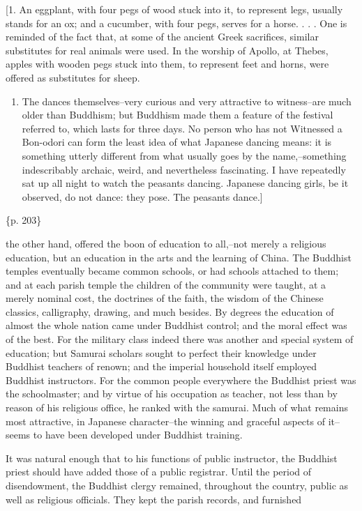 [1. An eggplant, with four pegs of wood stuck into it, to represent legs, usually stands for an ox; and a cucumber, with four pegs, serves for a horse. . . . One is reminded of the fact that, at some of the ancient Greek sacrifices, similar substitutes for real animals were used. In the worship of Apollo, at Thebes, apples with wooden pegs stuck into them, to represent feet and horns, were offered as substitutes for sheep.

\begin{enumerate}
\item The dances themselves--very curious and very attractive to witness--are much older than Buddhism; but Buddhism made them a feature of the festival referred to, which lasts for three days. No person who has not Witnessed a Bon-odori can form the least idea of what Japanese dancing means: it is something utterly different from what usually goes by the name,--something indescribably archaic, weird, and nevertheless fascinating. I have repeatedly sat up all night to watch the peasants dancing. Japanese dancing girls, be it observed, do not dance: they pose. The peasants dance.]
\end{enumerate}

\{p. 203\}

the other hand, offered the boon of education to all,--not merely a religious education, but an education in the arts and the learning of China. The Buddhist temples eventually became common schools, or had schools attached to them; and at each parish temple the children of the community were taught, at a merely nominal cost, the doctrines of the faith, the wisdom of the Chinese classics, calligraphy, drawing, and much besides. By degrees the education of almost the whole nation came under Buddhist control; and the moral effect was of the best. For the military class indeed there was another and special system of education; but Samurai scholars sought to perfect their knowledge under Buddhist teachers of renown; and the imperial household itself employed Buddhist instructors. For the common people everywhere the Buddhist priest was the schoolmaster; and by virtue of his occupation as teacher, not less than by reason of his religious office, he ranked with the samurai. Much of what remains most attractive, in Japanese character--the winning and graceful aspects of it--seems to have been developed under Buddhist training.

It was natural enough that to his functions of public instructor, the Buddhist priest should have added those of a public registrar. Until the period of disendowment, the Buddhist clergy remained, throughout the country, public as well as religious officials. They kept the parish records, and furnished

